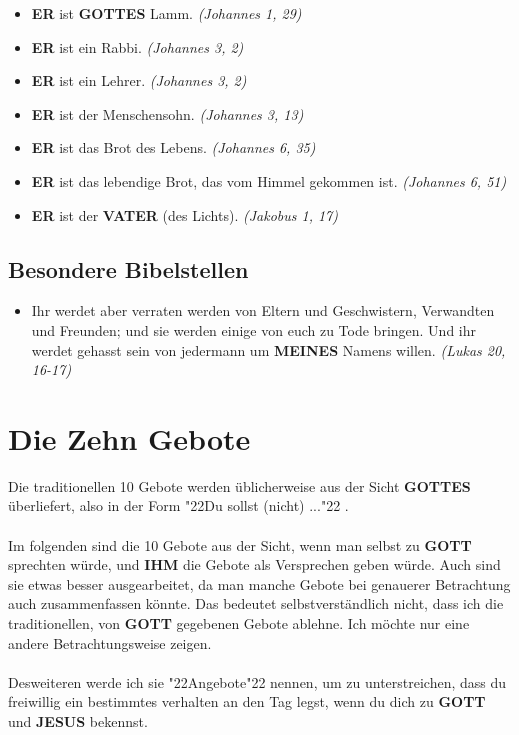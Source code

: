\documentclass[12pt,a5paper]{article}
\newcommand{\Er}[0]{\textbf{ER}}
\newcommand{\Gottes}[0]{\textbf{GOTTES}}
\newcommand{\Gott}[0]{\textbf{GOTT}}
\newcommand{\Ihm}[0]{\textbf{IHM}}
\newcommand{\Jesus}[0]{\textbf{JESUS}}
\newcommand{\Meines}[0]{\textbf{MEINES}}
\newcommand{\Vater}[0]{\textbf{VATER}}
\newcommand{\q}[1]{\char"22{#1}\char"22 }
\begin{document}
\begin{itemize}[nosep]
			\item {\Er} ist {\Gottes} Lamm. \textit{(Johannes 1, 29)}			
			\item {\Er} ist ein Rabbi. \textit{(Johannes 3, 2)}
			\item {\Er} ist ein Lehrer. \textit{(Johannes 3, 2)}
			\item {\Er} ist der Menschensohn. \textit{(Johannes 3, 13)}
			\item {\Er} ist das Brot des Lebens. \textit{(Johannes 6, 35)}
			\item {\Er} ist das lebendige Brot, das vom Himmel gekommen ist. \textit{(Johannes 6, 51)}
			\item {\Er} ist der {\Vater} (des Lichts). \textit{(Jakobus 1, 17)}
		\end{itemize}

	\newpage
	\subsection{Besondere Bibelstellen}
		\begin{itemize}[nosep]
			\item	Ihr werdet aber verraten werden von Eltern und Geschwistern,
					Verwandten und Freunden;
					und sie werden einige von euch zu Tode bringen.
					Und ihr werdet gehasst sein von jedermann um {\Meines} Namens willen.
					\textit{(Lukas 20, 16-17)}
		\end{itemize}
		
	\newpage
	\section{Die Zehn Gebote}
		Die traditionellen 10 Gebote werden \"ublicherweise aus der Sicht {\Gottes} \"uberliefert,
		also in der Form \q{Du sollst (nicht) ...}.
		\\
		\\
		Im folgenden sind die 10 Gebote aus der Sicht,
		wenn man selbst zu {\Gott} sprechten w\"urde,
		und {\Ihm} die Gebote als Versprechen geben w\"urde.
		Auch sind sie etwas besser ausgearbeitet,
		da man manche Gebote bei genauerer Betrachtung auch zusammenfassen k\"onnte.
		Das bedeutet selbstverst\"andlich nicht,
		dass ich die traditionellen,
		von {\Gott} gegebenen Gebote ablehne.
		Ich m\"ochte nur eine andere Betrachtungsweise zeigen.
		\\
		\\
		Desweiteren werde ich sie \q{Angebote} nennen,
		um zu unterstreichen,
		dass du freiwillig ein bestimmtes verhalten an den Tag legst,
		wenn du dich zu {\Gott} und {\Jesus} bekennst.
	
\end{document}
